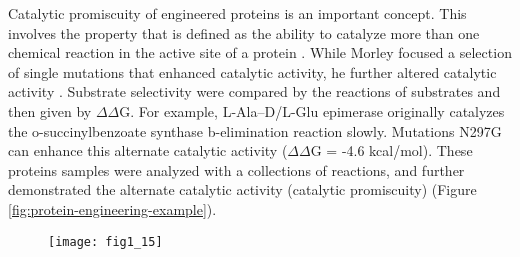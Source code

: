 \begin{refsection}
Catalytic promiscuity of engineered proteins is an important concept. This
involves the property that is defined as the ability to catalyze more than one
chemical reaction in the active site of a protein \cite{Kazlauskas2005a}. While
Morley  focused a selection of single mutations that enhanced
catalytic activity, he further altered catalytic activity \cite{Morley2005a}.
Substrate selectivity were compared by the reactions of substrates and then
given by $\Delta$$\Delta$G. For example, L-Ala–D/L-Glu epimerase originally
catalyzes the o-succinylbenzoate synthase b-elimination reaction slowly.
Mutations N297G can enhance this alternate catalytic activity
($\Delta$$\Delta$G = -4.6 kcal/mol). These proteins samples were analyzed with
a collections of reactions, and further demonstrated the alternate catalytic
activity (catalytic promiscuity) \cite{Kazlauskas2005a} (Figure
\ref{fig:protein-engineering-example}).
\begin{figure}[htbp] \centering \texttt{[image: fig1\_15]}

\end{figure}
\end{refsection}

